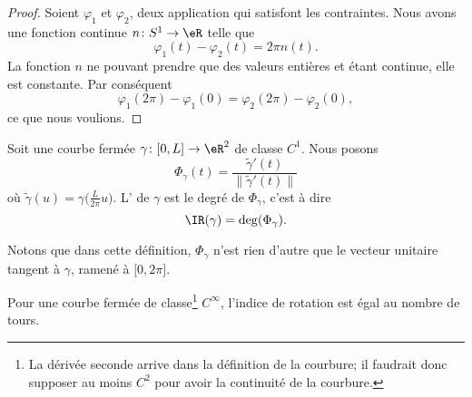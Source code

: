 \begin{proof}
    Soient \( \varphi_1\) et \( \varphi_2\), deux application qui satisfont les contraintes. Nous avons une fonction continue \( n\colon S^1\to \eR\) telle que
    \begin{equation}
        \varphi_1(t)-\varphi_2(t)=2\pi n(t).
    \end{equation}
    La fonction \( n\) ne pouvant prendre que des valeurs entières et étant continue, elle est constante. Par conséquent
    \begin{equation}
        \varphi_1(2\pi)-\varphi_1(0)=\varphi_2(2\pi)-\varphi_2(0),
    \end{equation}
    ce que nous voulions.
\end{proof}

\begin{definition}      \label{DEFooOCUQooUAlbLo}
    Soit une courbe fermée \( \gamma\colon \mathopen[ 0 , L \mathclose]\to \eR^2\) de classe \( C^1\). Nous posons
    \begin{equation}
        \Phi_{\gamma}(t)=\frac{ \tilde \gamma'(t) }{ \| \tilde \gamma'(t) \| }
    \end{equation}
    où \( \tilde \gamma(u)=\gamma\big( \frac{ L }{ 2\pi }u \big)\). L' de \( \gamma\) est le degré de \( \Phi_{\gamma}\), c'est à dire
    \begin{equation}
        \IR(\gamma)=\deg(\Phi_{\gamma}).
    \end{equation}
\end{definition}
Notons que dans cette définition, \( \Phi_{\gamma}\) n'est rien d'autre que le vecteur unitaire tangent à \( \gamma\), ramené à \( \mathopen[ 0 , 2\pi \mathclose]\).

\begin{proposition}     \label{PROPooXHSDooDDnlJQ}
    Pour une courbe fermée de classe\footnote{La dérivée seconde arrive dans la définition de la courbure; il faudrait donc supposer au moins \( C^2\) pour avoir la continuité de la courbure.} \( C^{\infty}\), l'indice de rotation est égal au nombre de tours.
\end{proposition}

